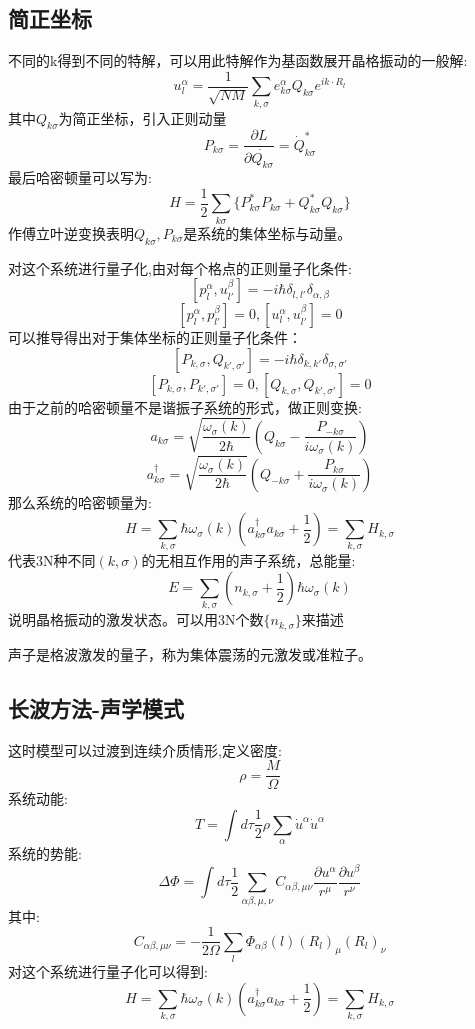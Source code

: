 \subsection{简正坐标}
不同的k得到不同的特解，可以用此特解作为基函数展开晶格振动的一般解:
\[u_l^\alpha=\frac{1}{\sqrt{NM}}\sum_{k,\sigma}e^{\alpha}_{k\sigma}Q_{k\sigma}e^{ik\cdot R_l}\]
其中$Q_{k\sigma}$为简正坐标，引入正则动量
\[P_{k\sigma}=\frac{\partial L}{\partial \dot{Q_{k\sigma}}}=\dot{Q}_{k\sigma}^*\]
最后哈密顿量可以写为:
\[H=\frac{1}{2}\sum_{k\sigma}\{P_{k\sigma}^*P_{k\sigma}+Q_{k\sigma}^*Q_{k\sigma}\}\]
作傅立叶逆变换表明$Q_{k\sigma},P_{k\sigma}$是系统的集体坐标与动量。\par
对这个系统进行量子化,由对每个格点的正则量子化条件:
\[[p_l^\alpha,u_{l'}^\beta]=-i\hbar\delta_{l,l'}\delta_{\alpha,\beta}\]
\[[p_l^\alpha,p_{l'}^\beta]=0,[u_l^\alpha,u_{l'}^\beta]=0\]
可以推导得出对于集体坐标的正则量子化条件：
\[[P_{k,\sigma},Q_{k',\sigma'}]=-i\hbar\delta_{k,k'}\delta_{\sigma,\sigma'}\]
\[[P_{k,\sigma},P_{k',\sigma'}]=0,[Q_{k,\sigma},Q_{k',\sigma'}]=0\]
由于之前的哈密顿量不是谐振子系统的形式，做正则变换:
\[a_{k\sigma}=\sqrt{\frac{\omega_\sigma(k)}{2\hbar}}(Q_{k\sigma}-\frac{P_{-k\sigma}}{i\omega_\sigma(k)})\]
\[a_{k\sigma}^\dagger=\sqrt{\frac{\omega_\sigma(k)}{2\hbar}}(Q_{-k\sigma}+\frac{P_{k\sigma}}{i\omega_\sigma(k)})\]
那么系统的哈密顿量为:
\[H=\sum_{k,\sigma}\hbar\omega_\sigma(k)(a_{k\sigma}^\dagger a_{k\sigma}+\frac{1}{2})=\sum_{k,\sigma}H_{k,\sigma}\]
代表3N种不同$(k,\sigma)$的无相互作用的声子系统，总能量:
\[E=\sum_{k,\sigma}(n_{k,\sigma}+\frac{1}{2})\hbar\omega_\sigma(k)\]
说明晶格振动的激发状态。可以用3N个数$\{n_{k,\sigma}\}$来描述\par
声子是格波激发的量子，称为集体震荡的元激发或准粒子。\par
\subsection{长波方法-声学模式}
这时模型可以过渡到连续介质情形,定义密度:
\[\rho=\frac{M}{\Omega}\]
系统动能:
\[T=\int d\tau \frac{1}{2}\rho\sum_\alpha \dot{u}^\alpha\dot{u}^\alpha\]
系统的势能:
\[\Delta\Phi=\int d\tau \frac{1}{2}\sum_{\alpha\beta,\mu,\nu}C_{\alpha\beta,\mu\nu}\frac{\partial u^\alpha}{r^\mu}\frac{\partial u^\beta}{r^\nu}\]
其中:
\[C_{\alpha\beta,\mu\nu}=-\frac{1}{2\Omega}\sum_l\Phi_{\alpha\beta}(l)(R_l)_\mu(R_l)_\nu\]
对这个系统进行量子化可以得到:
\[H=\sum_{k,\sigma}\hbar\omega_\sigma(k)(a_{k\sigma}^\dagger a_{k\sigma}+\frac{1}{2})=\sum_{k,\sigma}H_{k,\sigma}\]
